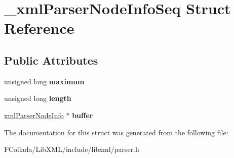 \hypertarget{struct__xmlParserNodeInfoSeq}{
\section{\_\-xmlParserNodeInfoSeq Struct Reference}
\label{struct__xmlParserNodeInfoSeq}
}
\subsection*{Public Attributes}
\begin{DoxyCompactItemize}
\item 
\hypertarget{struct__xmlParserNodeInfoSeq_aa8546837e510e099b0e8790700b9c8ff}{
unsigned long {\bfseries maximum}}
\label{struct__xmlParserNodeInfoSeq_aa8546837e510e099b0e8790700b9c8ff}

\item 
\hypertarget{struct__xmlParserNodeInfoSeq_a09bd6c0f172702df82cfbef8b03f7e0a}{
unsigned long {\bfseries length}}
\label{struct__xmlParserNodeInfoSeq_a09bd6c0f172702df82cfbef8b03f7e0a}

\item 
\hypertarget{struct__xmlParserNodeInfoSeq_ada2d42841c64e792f483bab9451fdbd4}{
\hyperlink{struct__xmlParserNodeInfo}{xmlParserNodeInfo} $\ast$ {\bfseries buffer}}
\label{struct__xmlParserNodeInfoSeq_ada2d42841c64e792f483bab9451fdbd4}

\end{DoxyCompactItemize}


The documentation for this struct was generated from the following file:\begin{DoxyCompactItemize}
\item 
FCollada/LibXML/include/libxml/parser.h\end{DoxyCompactItemize}
